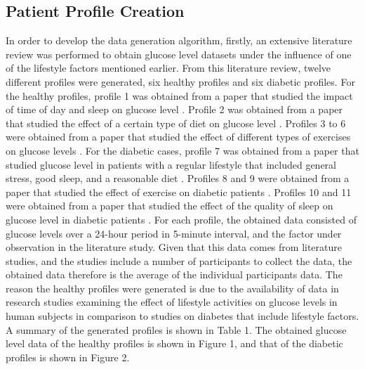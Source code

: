 \subsection{Patient Profile Creation}
\label{subsec:patient_profile_creation}
In order to develop the data generation algorithm, firstly, an extensive literature review was performed to obtain glucose level datasets under the influence of one of the lifestyle factors mentioned earlier. From this literature review, twelve different profiles were generated, six healthy profiles and six diabetic profiles. For the healthy profiles, profile 1 was obtained from a paper that studied the impact of time of day and sleep on glucose level \cite{7}. Profile 2 was obtained from a paper that studied the effect of a certain type of diet on glucose level \cite{8}. Profiles 3 to 6 were obtained from a paper that studied the effect of different types of exercises on glucose levels \cite{9}.  For the diabetic cases, profile 7 was obtained from a paper that studied glucose level in patients with a regular lifestyle that included general stress, good sleep, and a reasonable diet \cite{10}. Profiles 8 and 9 were obtained from a paper that studied the effect of exercise on diabetic patients \cite{11}.  Profiles 10 and 11 were obtained from a paper that studied the effect of the quality of sleep on glucose level in diabetic patients \cite{12}. For each profile, the obtained data consisted of glucose levels over a 24-hour period in 5-minute interval, and the factor under observation in the literature study. Given that this data comes from literature studies, and the studies include a number of participants to collect the data, the obtained data therefore is the average of the individual participants data. The reason the healthy profiles were generated is due to the availability of data in research studies examining the effect of lifestyle activities on glucose levels in human subjects in comparison to studies on diabetes that include lifestyle factors. A summary of the generated profiles is shown in Table 1.  The obtained glucose level data of the healthy profiles is shown in Figure 1, and that of the diabetic profiles is shown in Figure 2.

